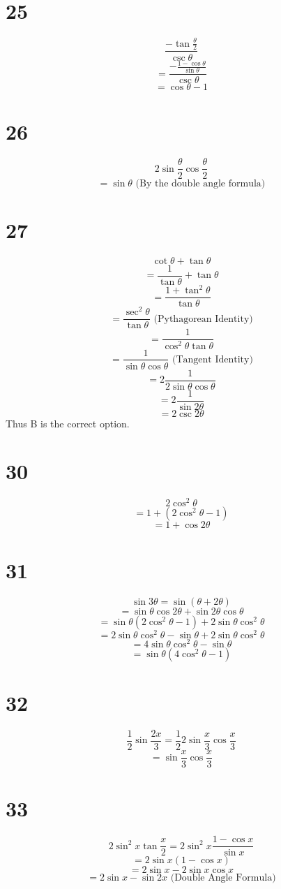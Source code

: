 \documentclass{article}
\theoremstyle{definition}
\newcommand{\?}{\stackrel{?}{=}}
\begin{document}
\section*{25}
\[ \dfrac{-\tan\frac{\theta}{2}}{\csc\theta} \]
\[ =\dfrac{-\frac{1-\cos\theta}{\sin\theta}}{\csc\theta} \]
\[ =\cos\theta-1 \]

\section*{26}
\[ 2\sin\frac{\theta}{2}\cos\frac{\theta}{2} \]
\[ =\sin\theta\textrm{ (By the double angle formula)} \]

\section*{27}
\[ \cot\theta+\tan\theta \]
\[ =\frac{1}{\tan\theta}+\tan\theta \]
\[ =\frac{1+\tan^2\theta}{\tan\theta} \]
\[ =\frac{\sec^2\theta}{\tan\theta}\textrm{ (Pythagorean Identity)} \]
\[ =\frac{1}{\cos^2\theta\tan\theta} \]
\[ =\frac{1}{\sin\theta\cos\theta}\textrm{ (Tangent Identity)} \]
\[ =2\frac{1}{2\sin\theta\cos\theta} \]
\[ =2\frac{1}{\sin 2\theta} \]
\[ =2\csc 2\theta \]
Thus B is the correct option.

\section*{30}
\[ 2\cos^2\theta \]
\[ =1+(2\cos^2\theta-1) \]
\[ =1+\cos 2\theta \]

\section*{31}
\[ \sin 3\theta=\sin(\theta+2\theta) \]
\[ =\sin\theta\cos 2\theta+\sin 2\theta\cos\theta \]
\[ =\sin\theta(2\cos^2\theta-1)+2\sin\theta\cos^2\theta \]
\[ =2\sin\theta\cos^2\theta-\sin\theta+2\sin\theta\cos^2\theta \]
\[ =4\sin\theta\cos^2\theta-\sin\theta \]
\[ =\sin\theta(4\cos^2\theta-1) \]

\section*{32}
\[ \frac{1}{2}\sin\frac{2x}{3}=\frac{1}{2}2\sin\frac{x}{3}\cos\frac{x}{3} \]
\[ =\sin\frac{x}{3}\cos\frac{x}{3} \]

\section*{33}
\[ 2\sin^2 x\tan\frac{x}{2}=2\sin^2 x\frac{1-\cos x}{\sin x} \]
\[ =2\sin x(1-\cos x) \]
\[ =2\sin x-2\sin x\cos x \]
\[ =2\sin x-\sin 2x\textrm{ (Double Angle Formula)} \]
\end{document}
